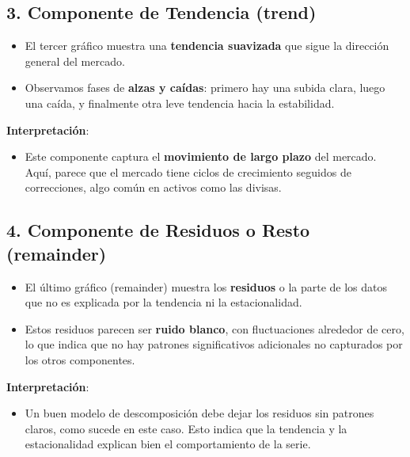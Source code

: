 \documentclass[
]{book}
\providecommand{\tightlist}{%
  \setlength{\itemsep}{0pt}\setlength{\parskip}{0pt}}
\begin{document}
\subsection{\texorpdfstring{3. \textbf{Componente de Tendencia (trend)}}{3. Componente de Tendencia (trend)}}\label{componente-de-tendencia-trend}

\begin{itemize}
\item
  El tercer gráfico muestra una \textbf{tendencia suavizada} que sigue la dirección general del mercado.
\item
  Observamos fases de \textbf{alzas y caídas}: primero hay una subida clara, luego una caída, y finalmente otra leve tendencia hacia la estabilidad.
\end{itemize}

\textbf{Interpretación}:

\begin{itemize}
\tightlist
\item
  Este componente captura el \textbf{movimiento de largo plazo} del mercado. Aquí, parece que el mercado tiene ciclos de crecimiento seguidos de correcciones, algo común en activos como las divisas.
\end{itemize}

\subsection{\texorpdfstring{4. \textbf{Componente de Residuos o Resto (remainder)}}{4. Componente de Residuos o Resto (remainder)}}\label{componente-de-residuos-o-resto-remainder}

\begin{itemize}
\item
  El último gráfico (remainder) muestra los \textbf{residuos} o la parte de los datos que no es explicada por la tendencia ni la estacionalidad.
\item
  Estos residuos parecen ser \textbf{ruido blanco}, con fluctuaciones alrededor de cero, lo que indica que no hay patrones significativos adicionales no capturados por los otros componentes.
\end{itemize}

\textbf{Interpretación}:

\begin{itemize}
\tightlist
\item
  Un buen modelo de descomposición debe dejar los residuos sin patrones claros, como sucede en este caso. Esto indica que la tendencia y la estacionalidad explican bien el comportamiento de la serie.
\end{itemize}
\end{document}
